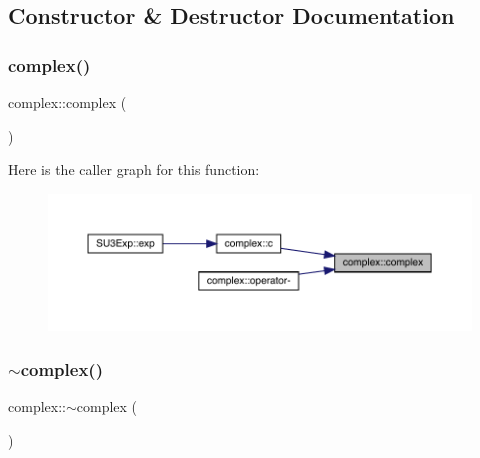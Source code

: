 \subsection{Constructor \& Destructor Documentation}
\mbox{\label{classcomplex_a1fb8d3affbc54c1ad34a0820b357e194}} 
\subsubsection{\texorpdfstring{complex()}{complex()}\hspace{0.1cm}{\footnotesize\ttfamily [1/3]}}
{\footnotesize\ttfamily complex\+::complex (\begin{DoxyParamCaption}{ }\end{DoxyParamCaption})}

Here is the caller graph for this function\+:\nopagebreak
\begin{figure}[H]
\begin{center}
\leavevmode
\includegraphics[width=350pt]{classcomplex_a1fb8d3affbc54c1ad34a0820b357e194_icgraph}
\end{center}
\end{figure}
\mbox{\label{classcomplex_abd31d1c53fe873fa4ec0fbce50601485}} 
\subsubsection{\texorpdfstring{$\sim$complex()}{~complex()}}
{\footnotesize\ttfamily complex\+::$\sim$complex (\begin{DoxyParamCaption}{ }\end{DoxyParamCaption})}

\mbox{\label{classcomplex_ab8d6f234864954c1ab460984a1e32bd3}} 
